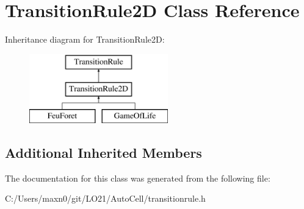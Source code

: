 \hypertarget{class_transition_rule2_d}{}\section{Transition\+Rule2D Class Reference}
\label{class_transition_rule2_d}
Inheritance diagram for Transition\+Rule2D\+:\begin{figure}[H]
\begin{center}
\leavevmode
\includegraphics[height=3.000000cm]{class_transition_rule2_d}
\end{center}
\end{figure}
\subsection*{Additional Inherited Members}


The documentation for this class was generated from the following file\+:\begin{DoxyCompactItemize}
\item 
C\+:/\+Users/maxn0/git/\+L\+O21/\+Auto\+Cell/transitionrule.\+h\end{DoxyCompactItemize}
